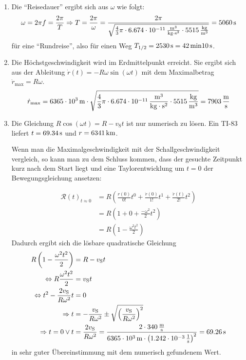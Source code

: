 \documentclass[a4paper]{scrartcl}
\begin{document}
\begin{enumerate}[noitemsep]
  \item Die "`Reisedauer"' ergibt sich aus $\omega$ wie folgt:
    \begin{equation*}
      \omega = 2\pi f = \frac{2\pi}{T} \Rightarrow T = \frac{2\pi}{\omega} = \frac{2\pi}{\sqrt{\frac{4}{3}\pi \cdot \unit[6.674 \cdot 10^{-11}]{\frac{m^3}{kg \cdot s^2}} \cdot \unit[5515]{\frac{kg}{m^3}}}} = \unit[5060]{s}
    \end{equation*}
    für eine "`Rundreise"', also für einen Weg $T_{1/2} = \unit[2530]{s} = \unit[42]{min}\unit[10]{s}$.
  \item Die Höchstgeschwindigkeit wird im Erdmittelpunkt erreicht. Sie ergibt sich aus der Ableitung $\dot r(t) = - R\omega \sin(\omega t)$ mit dem Maximalbetrag $\dot r_\text{max} = R\omega$.
    \begin{equation*}
      \dot r_\text{max} = \unit[6365\cdot10^3]{m} \cdot \sqrt{\frac{4}{3}\pi \cdot \unit[6.674 \cdot 10^{-11}]{\frac{m^3}{kg \cdot s^2}} \cdot \unit[5515]{\frac{kg}{m^3}}} = \unit[7903]{\frac{m}{s}}
    \end{equation*}
  \item Die Gleichung $R\cos(\omega t) = R - v_\text{S}t$ ist nur numerisch zu lösen. Ein TI-83 liefert $t = \unit[69.34]{s}$ und $r = \unit[6341]{km}$.

    Wenn man die Maximalgeschwindigkeit mit der Schallgeschwindigkeit vergleich, so kann man zu dem Schluss kommen, dass der gesuchte Zeitpunkt kurz nach dem Start liegt und eine Taylorentwicklung um $t=0$ der Bewegungsgleichung ansetzen:

    \begin{align*}
      \mathcal R(t)_{t\approx 0} & = R\left(\frac{r(0)}{0!} t^0 + \frac{\dot r(0)}{1!} t^1 + \frac{\ddot r(t)}{2!}t^2\right)\\
      & = R\left(1 + 0 + \frac{-\omega^2}{2}t^2\right)\\
      & = R\left(1 - \frac{\omega^2 t^2}{2}\right)
    \end{align*}
    Dadurch ergibt sich die lösbare quadratische Gleichung 
    \begin{align*}
      R\left( 1-\frac{\omega^2 t^2}{2} \right) & = R - v_\text{S}t \\
      \Leftrightarrow R \frac{\omega^2 t^2}{2} & = v_\text{S}t \\
      \Leftrightarrow t^2 - \frac{2v_\text{S}}{R \omega^2}t & = 0 \\
      \Rightarrow t & = - \frac{v_\text{S}}{R\omega^2} \pm \sqrt{\left( \frac{v_\text{S}}{R\omega^2} \right)^2} \\
      \Rightarrow t = 0 \lor t & =\frac{2v_\text{S}}{R\omega^2} = \frac{2 \cdot \unit[340]{\frac{m}{s}}}{\unit[6365 \cdot 10^3]{m} \cdot \left(\unit[1.242 \cdot 10^{-3}]{\frac{1}{s}}\right)^2} = \unit[69.26]{s}
    \end{align*}
    in sehr guter Übereinstimmung mit dem numerisch gefundenem Wert.
\end{enumerate}
\end{document}
